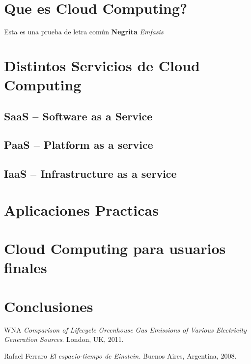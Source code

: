 \documentclass[12pt,a4paper]{article}
\author{Ignacio Perez Laborda}
\begin{document}


\tableofcontents

\listoffigures

\newpage

\section{Que es Cloud Computing?}
Esta es una prueba de letra común \textbf{Negrita} \emph{Emfasis}

\section{Distintos Servicios de Cloud Computing}
\subsection{SaaS -- Software as a Service}
\subsection{PaaS -- Platform as a service}
\subsection{IaaS -- Infrastructure as a service}

\section{Aplicaciones Practicas}

\section{Cloud Computing para usuarios finales}

\section{Conclusiones}

\newpage
\begin{thebibliography}{9}

  WNA
  \emph{Comparison of Lifecycle Greenhouse Gas Emissions of Various Electricity Generation Sources}.
  London, UK,
  2011.

  Rafael Ferraro
  \emph{El espacio-tiempo de Einstein.}
  Buenos Aires, Argentina,
  2008.
		
\end{thebibliography}
\end{document}
